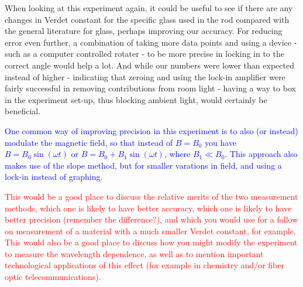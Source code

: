 \documentclass[prb,preprint]{revtex4-1}
\begin{document}
When looking at this experiment again, it could be useful to see if there are any changes in Verdet constant for the specific glass used in the rod compared with the general literature for glass, perhaps improving our accuracy. For reducing error even further, a combination of taking more data points and using a device - such as a computer controlled rotater - to be more precise in locking in to the correct angle would help a lot. And while our numbers were lower than expected instead of higher - indicating that zeroing and using the lock-in amplifier were fairly successful in removing contributions from room light - having a way to box in the experiment set-up, thus blocking ambient light, would certainly be beneficial.

\textcolor{blue}{One common way of improving precision in this experiment is to also (or instead) modulate the magnetic field, so that instead of $B = B_0$ you have  $B = B_0 \sin(\omega t)$ or $B=B_0 + B_1 \sin(\omega t)$, where $B_1 \ll B_0$. This approach also makes use of the slope method, but for smaller varations in field, and using a lock-in instead of graphing.}

\textcolor{red} {This would be a good place to discuss the relative merits of the two measurement methods, which one is likely to have better accuracy, which one is likely to have better precision (remember the difference?), and which you would use for a follow on measurement of a material with a much smaller Verdet constant, for example. This would also be a good place to discuss how you might modify the experiment to measure the wavelength dependence, as well as to mention important technological applications of this effect (for example in chemistry and/or fiber optic telecommunications). }
\end{document}
